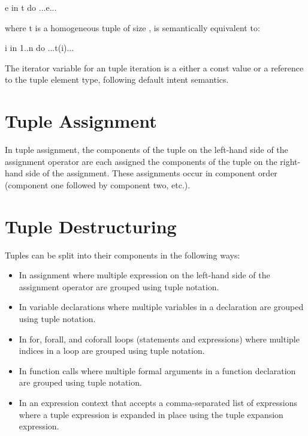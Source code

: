 \begin{chapel}
 e in t do
  ...e...
\end{chapel}

where t is a homogeneous tuple of size , is semantically
equivalent to:

\begin{chapel}
 i in 1..n do
  ...t(i)...
\end{chapel}

The iterator variable for an tuple iteration is a either a const value
or a reference to the tuple element type, following default intent
semantics.

\section{Tuple Assignment}
\label{Tuple_Assignment}

In tuple assignment, the components of the tuple on the left-hand side
of the assignment operator are each assigned the components of the
tuple on the right-hand side of the assignment.  These assignments
occur in component order (component one followed by component two,
etc.).

\section{Tuple Destructuring}
\label{Tuple_Destructuring}

Tuples can be split into their components in the following ways:
\begin{itemize}
\item In assignment where multiple expression on the left-hand side of
the assignment operator are grouped using tuple notation.
\item In variable declarations where multiple variables in a
declaration are grouped using tuple notation.
\item In for, forall, and coforall loops (statements and expressions)
where multiple indices in a loop are grouped using tuple notation.
\item In function calls where multiple formal arguments in a function
declaration are grouped using tuple notation.
\item In an expression context that accepts a comma-separated list of
expressions where a tuple expression is expanded in place using the
tuple expansion expression.
\end{itemize}

